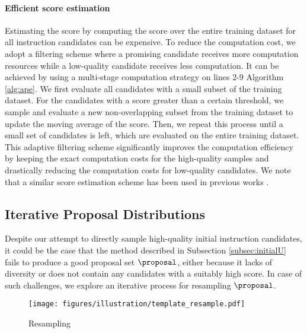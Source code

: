 \paragraph{Efficient score estimation}
Estimating the score by computing the score over the entire training dataset for all instruction candidates can be expensive. To reduce the computation cost, we adopt a filtering scheme where a promising candidate receives more computation resources while a low-quality candidate receives less computation. 
It can be achieved by using a multi-stage computation strategy on lines 2-9 Algorithm \ref{alg:ape}. We first evaluate all candidates with a small subset of the training dataset. For the candidates with a score greater than a certain threshold, we sample and evaluate a new non-overlapping subset from the training dataset to update the moving average of the score. 
Then, we repeat this process until a small set of candidates is left, which are evaluated on the entire training dataset. 
This adaptive filtering scheme significantly improves the computation efficiency by keeping the exact computation costs for the high-quality samples and drastically reducing the computation costs for low-quality candidates. 
We note that a similar score estimation scheme has been used in previous works \citep{li2022competition, maclaurin2015firefly}.

\subsection{Iterative Proposal Distributions}\label{sec:iterative}
Despite our attempt to directly sample high-quality initial instruction candidates, it could be the case that the method described in Subsection \ref{subsec:initialU} fails to produce a good proposal set $\proposal$, either because it lacks of diversity or does not contain any candidates with a suitably high score. In case of such challenges, we explore an iterative process for resampling $\proposal$.

\begin{wrapfigure}{R}{0.3\textwidth}
\centering
\vspace{-0.1in}
\texttt{[image: figures/illustration/template\_resample.pdf]}
\caption{Resampling}
\vspace{-0.15in}
\label{fig:template_resampling}
\end{wrapfigure}


